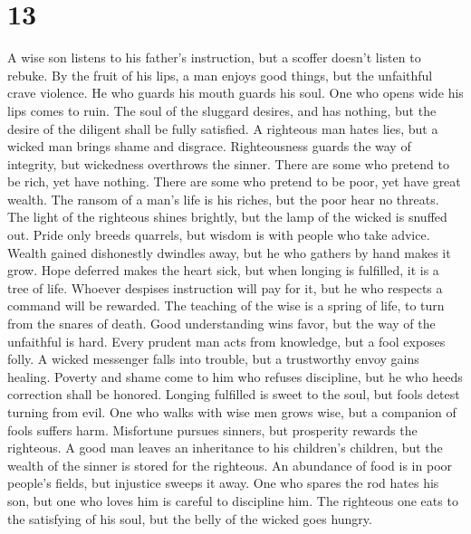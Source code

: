 \hypertarget{section-12}{%
\section{13}\label{section-12}}

 A wise son listens to his father's instruction, but a
scoffer doesn't listen to rebuke.  By the fruit of his
lips, a man enjoys good things, but the unfaithful crave violence.
 He who guards his mouth guards his soul. One who opens
wide his lips comes to ruin.  The soul of the sluggard
desires, and has nothing, but the desire of the diligent shall be fully
satisfied.  A righteous man hates lies, but a wicked man
brings shame and disgrace.  Righteousness guards the way
of integrity, but wickedness overthrows the sinner.  There
are some who pretend to be rich, yet have nothing. There are some who
pretend to be poor, yet have great wealth.  The ransom of
a man's life is his riches, but the poor hear no threats. 
The light of the righteous shines brightly, but the lamp of the wicked
is snuffed out.  Pride only breeds quarrels, but wisdom
is with people who take advice.  Wealth gained
dishonestly dwindles away, but he who gathers by hand makes it grow.
 Hope deferred makes the heart sick, but when longing is
fulfilled, it is a tree of life.  Whoever despises
instruction will pay for it, but he who respects a command will be
rewarded.  The teaching of the wise is a spring of life,
to turn from the snares of death.  Good understanding
wins favor, but the way of the unfaithful is hard.  Every
prudent man acts from knowledge, but a fool exposes folly.
 A wicked messenger falls into trouble, but a trustworthy
envoy gains healing.  Poverty and shame come to him who
refuses discipline, but he who heeds correction shall be honored.
 Longing fulfilled is sweet to the soul, but fools detest
turning from evil.  One who walks with wise men grows
wise, but a companion of fools suffers harm.  Misfortune
pursues sinners, but prosperity rewards the righteous.  A
good man leaves an inheritance to his children's children, but the
wealth of the sinner is stored for the righteous.  An
abundance of food is in poor people's fields, but injustice sweeps it
away.  One who spares the rod hates his son, but one who
loves him is careful to discipline him.  The righteous
one eats to the satisfying of his soul, but the belly of the wicked goes
hungry.

